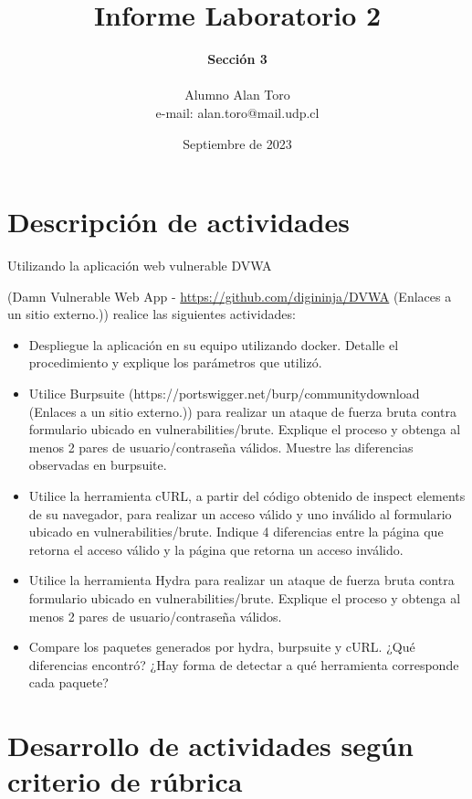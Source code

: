 \documentclass[letter,12pt]{article}
\begin{document}
\title{\Huge{Informe Laboratorio 2}}
\author{\textbf{Sección 3} \\  \\Alumno Alan Toro \\ e-mail: alan.toro@mail.udp.cl}
\date{Septiembre de 2023}
\maketitle
\tableofcontents
\newpage

\section{Descripción de actividades}
Utilizando la aplicación web vulnerable DVWA

(Damn Vulnerable Web App
- \href{https://github.com/digininja/DVWA}{https://github.com/digininja/DVWA}
(Enlaces a un sitio externo.)) realice las siguientes actividades:


\begin{itemize}
  \item Despliegue la aplicación en su equipo utilizando docker. Detalle el
        procedimiento y explique los parámetros que utilizó.
  \item Utilice Burpsuite (https://portswigger.net/burp/communitydownload
        (Enlaces a un sitio externo.)) para realizar un ataque de fuerza bruta contra
        formulario ubicado en vulnerabilities/brute. Explique el proceso y obtenga al
        menos 2 pares de usuario/contraseña válidos. Muestre las diferencias observadas
        en burpsuite.
  \item Utilice la herramienta cURL, a partir del código obtenido de inspect
        elements de su navegador, para realizar un acceso válido y uno inválido al
        formulario ubicado en vulnerabilities/brute. Indique 4 diferencias entre la
        página que retorna el acceso válido y la página que retorna un acceso inválido.
  \item Utilice la herramienta Hydra para realizar un ataque de fuerza bruta
        contra formulario ubicado en vulnerabilities/brute. Explique el proceso y
        obtenga al menos 2 pares de usuario/contraseña válidos.
  \item Compare los paquetes generados por hydra, burpsuite y cURL. ¿Qué
        diferencias encontró? ¿Hay forma de detectar a qué herramienta corresponde cada
        paquete?
\end{itemize}

\section{Desarrollo de actividades según criterio de rúbrica}
\end{document}
